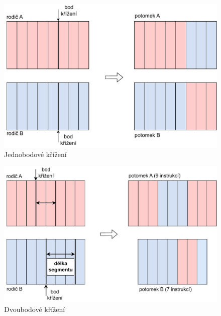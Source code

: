 \begin{figure}[!h]
    \centering
    \includegraphics[scale=0.65]{obrazky-figures/lgp-cross-one.pdf}
    \caption{Jednobodové křížení}
    \label{fig:lgp-crossover-one-point}
\end{figure}

\begin{figure}[!h]
    \centering
    \includegraphics[scale=0.65]{obrazky-figures/lgp-cross-two.pdf}
    \caption{Dvoubodové křížení}
    \label{fig:lgp-crossover-two-point}
\end{figure}

\newpage
